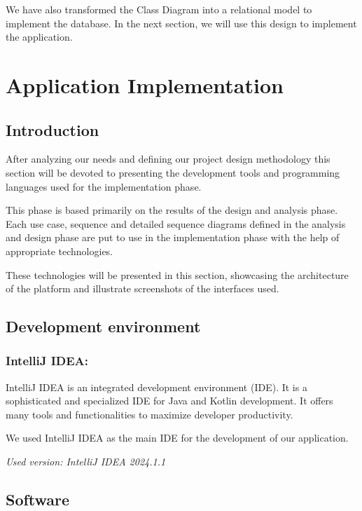 \documentclass{article}
\begin{document}
We have also transformed the Class Diagram into a relational model to implement the database. 
In the next section, we will use this design to implement the application.

\newpage
\section[Application Implementation]{Application Implementation}
\subsection[Introduction]{Introduction}

After analyzing our needs and defining our project design methodology 
this section will be devoted to presenting the development tools and programming languages used for the implementation phase. 

This phase is based primarily on the results of the design and analysis phase. Each use case, sequence and detailed sequence diagrams defined in the analysis and design phase are put to use in the implementation phase with the help of appropriate technologies.

These technologies will be presented in this section, showcasing the architecture of the platform and illustrate screenshots of the interfaces used.

\subsection[Development environment]{Development environment}

\subsubsection*{IntelliJ IDEA:}

IntelliJ IDEA is an integrated development environment (IDE). It is a sophisticated and specialized IDE for Java and Kotlin development. It offers many tools and functionalities to maximize developer productivity.

We used IntelliJ IDEA as the main IDE for the development of our application.

\textit{Used version: IntelliJ IDEA 2024.1.1}

\subsection[Software]{Software}
\end{document}
